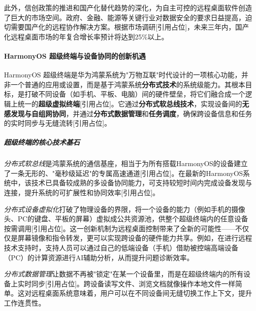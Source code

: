 \documentclass[12pt,a4paper]{article}
\renewcommand{\cite}[1]{[引用占位]}
\begin{document}
此外，信创政策的推进和国产化替代趋势的深化，为自主可控的远程桌面软件创造了巨大的市场空间。政府、金融、能源等关键行业对数据安全的要求日益提高，迫切需要国产化的远程协作解决方案。根据市场调研\cite{idc2023localization}，未来三年内，国产化远程桌面市场的年复合增长率预计将达到25\%以上。

\paragraph{HarmonyOS 超级终端与设备协同的创新机遇}

HarmonyOS 超级终端是华为鸿蒙系统为"万物互联"时代设计的一项核心功能，并非一个普通的应用或设置，而是基于鸿蒙系统\textbf{分布式技术}的系统级能力。其根本目标，是打破不同设备（如手机、平板、电脑）间的硬件壁垒，将它们融合成一个逻辑上统一的\textbf{超级虚拟终端}\cite{huawei2026freestream,huawei2024harmonyosoverview}。它通过\textbf{分布式软总线技术}，实现设备间的\textbf{无感发现与自组网协同}，并通过\textbf{分布式数据管理}和\textbf{任务调度}，确保跨设备信息和任务的实时同步与无缝流转\cite{huawei2026dfs,huawei2026codelabsdf}。

\subparagraph{超级终端的核心技术基石}

\textit{分布式软总线}是鸿蒙系统的通信基座，相当于为所有搭载HarmonyOS的设备建立了一条无形的、"毫秒级延迟"的专属高速通道\cite{huawei2024harmonyosoverview,huawei2025harmonyos50,huawei2025harmonyos51}。在最新的HarmonyOS系统中，该技术已具备较成熟的多设备协同能力，可支持较短时间内完成设备发现与连接，提升系统的可扩展性和协同效率\cite{huawei2025harmonyos51}。

\textit{分布式设备虚拟化}打破了物理设备的界限，将一个设备的能力（例如手机的摄像头、PC的键盘、平板的屏幕）虚拟成公共资源池，供整个超级终端内的任意设备按需调用\cite{huawei2024harmonyosoverview,huawei2025harmonyos51}。这一创新机制为远程桌面控制带来了全新的可能性——不仅仅是屏幕镜像和指令转发，更可以实现跨设备的硬件能力共享。例如，在进行远程技术支持时，支持人员可以通过自己的低端设备（手机）借助被控端高端设备（PC）的计算资源进行AI辅助分析，从而提升问题诊断效率。

\textit{分布式数据管理}让数据不再被"锁定"在某一个设备里，而是在超级终端内的所有设备上实时同步\cite{huawei2026dfs,huawei2026codelabsdf}。跨设备读写文件、浏览文档就像操作本地文件一样简单。这对远程桌面系统意味着，用户可以在不同设备间无缝切换工作上下文，提升工作连贯性。
\end{document}
